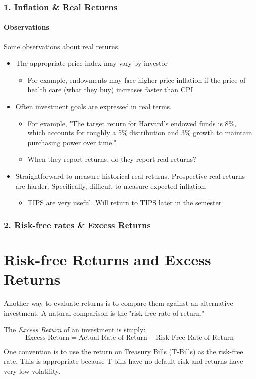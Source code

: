 \documentclass{beamer}
\begin{document}
\begin{frame}[t]
    \frametitle{1. Inflation \& Real Returns}
    \framesubtitle{Observations}

    Some observations about real returns.\\
    \begin{itemize}
      \item The appropriate price index may vary by investor
        \begin{itemize}        
        \item {\footnotesize For example, endowments may face higher price inflation if the price of health care (what they buy) increases faster than CPI.}
      \end{itemize}
      \item Often investment goals are expressed in real terms.  
      \begin{itemize}        
        \item {\footnotesize For example, "The target return for Harvard's endowed funds is 8\%, which accounts for roughly a 5\% distribution and 3\% growth to maintain purchasing power over time."}
        \item When they report returns, do they report real returns?
      \end{itemize}
      \item Straightforward to measure historical real returns.   Prospective real returns are harder.   Specifically, difficult to measure expected inflation.
      \begin{itemize}
        \item {\footnotesize TIPS are very useful.   Will return to TIPS later in the semester}
      \end{itemize}
    \end{itemize}
\end{frame}

\begin{frame}[t]
    \frametitle{2. Risk-free rates \& Excess Returns}
    \section{Risk-free Returns and Excess Returns}
    Another way to evaluate returns is to compare them against an alternative investment.  A natural comparison is the "risk-free rate of return."  
    
    \vspace{1em}
    The \textit{Excess Return} of an investment is simply:
    $$\text{Excess Return} = \text{Actual Rate of Return} - \text{Risk-Free Rate of Return}$$
    

    One convention is to use the return on Treasury Bills (T-Bills) as the risk-free rate.  This is appropriate because T-bills have no default risk and returns have very low volatility.\\
    \vspace{1em}

    
    

\end{frame}
\end{document}
